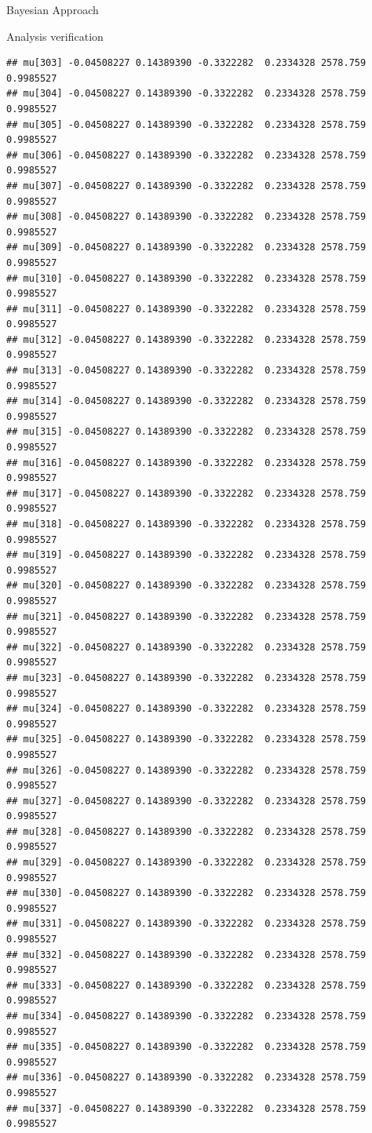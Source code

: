 \documentclass[
  ignorenonframetext,
]{beamer}
\begin{document}
\begin{frame}[fragile]{Bayesian Approach}
\begin{block}{Analysis verification}
\begin{verbatim}
## mu[303] -0.04508227 0.14389390 -0.3322282  0.2334328 2578.759 0.9985527
## mu[304] -0.04508227 0.14389390 -0.3322282  0.2334328 2578.759 0.9985527
## mu[305] -0.04508227 0.14389390 -0.3322282  0.2334328 2578.759 0.9985527
## mu[306] -0.04508227 0.14389390 -0.3322282  0.2334328 2578.759 0.9985527
## mu[307] -0.04508227 0.14389390 -0.3322282  0.2334328 2578.759 0.9985527
## mu[308] -0.04508227 0.14389390 -0.3322282  0.2334328 2578.759 0.9985527
## mu[309] -0.04508227 0.14389390 -0.3322282  0.2334328 2578.759 0.9985527
## mu[310] -0.04508227 0.14389390 -0.3322282  0.2334328 2578.759 0.9985527
## mu[311] -0.04508227 0.14389390 -0.3322282  0.2334328 2578.759 0.9985527
## mu[312] -0.04508227 0.14389390 -0.3322282  0.2334328 2578.759 0.9985527
## mu[313] -0.04508227 0.14389390 -0.3322282  0.2334328 2578.759 0.9985527
## mu[314] -0.04508227 0.14389390 -0.3322282  0.2334328 2578.759 0.9985527
## mu[315] -0.04508227 0.14389390 -0.3322282  0.2334328 2578.759 0.9985527
## mu[316] -0.04508227 0.14389390 -0.3322282  0.2334328 2578.759 0.9985527
## mu[317] -0.04508227 0.14389390 -0.3322282  0.2334328 2578.759 0.9985527
## mu[318] -0.04508227 0.14389390 -0.3322282  0.2334328 2578.759 0.9985527
## mu[319] -0.04508227 0.14389390 -0.3322282  0.2334328 2578.759 0.9985527
## mu[320] -0.04508227 0.14389390 -0.3322282  0.2334328 2578.759 0.9985527
## mu[321] -0.04508227 0.14389390 -0.3322282  0.2334328 2578.759 0.9985527
## mu[322] -0.04508227 0.14389390 -0.3322282  0.2334328 2578.759 0.9985527
## mu[323] -0.04508227 0.14389390 -0.3322282  0.2334328 2578.759 0.9985527
## mu[324] -0.04508227 0.14389390 -0.3322282  0.2334328 2578.759 0.9985527
## mu[325] -0.04508227 0.14389390 -0.3322282  0.2334328 2578.759 0.9985527
## mu[326] -0.04508227 0.14389390 -0.3322282  0.2334328 2578.759 0.9985527
## mu[327] -0.04508227 0.14389390 -0.3322282  0.2334328 2578.759 0.9985527
## mu[328] -0.04508227 0.14389390 -0.3322282  0.2334328 2578.759 0.9985527
## mu[329] -0.04508227 0.14389390 -0.3322282  0.2334328 2578.759 0.9985527
## mu[330] -0.04508227 0.14389390 -0.3322282  0.2334328 2578.759 0.9985527
## mu[331] -0.04508227 0.14389390 -0.3322282  0.2334328 2578.759 0.9985527
## mu[332] -0.04508227 0.14389390 -0.3322282  0.2334328 2578.759 0.9985527
## mu[333] -0.04508227 0.14389390 -0.3322282  0.2334328 2578.759 0.9985527
## mu[334] -0.04508227 0.14389390 -0.3322282  0.2334328 2578.759 0.9985527
## mu[335] -0.04508227 0.14389390 -0.3322282  0.2334328 2578.759 0.9985527
## mu[336] -0.04508227 0.14389390 -0.3322282  0.2334328 2578.759 0.9985527
## mu[337] -0.04508227 0.14389390 -0.3322282  0.2334328 2578.759 0.9985527

\end{verbatim}
\end{block}
\end{frame}
\end{document}
